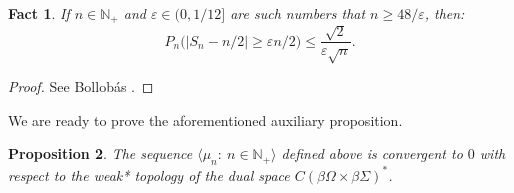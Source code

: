 \documentclass[11pt]{amsart}
\newtheorem{theorem}{Theorem}[section]
\newtheorem{proposition}[theorem]{Proposition}
\newtheorem{fact}[theorem]{Fact}
\theoremstyle{definition}
\theoremstyle{remark}
\numberwithin{equation}{section}
\newcommand{\eps}{\varepsilon}
\newcommand{\N}{\mathbb{N}}
\newcommand{\seq}[2]{\big\langle#1\colon\ #2\big\rangle}
\newcommand{\seqn}[1]{\big\langle#1\colon\ n\io\big\rangle}
\newcommand{\io}{\in\mathbb{N}}%
\newcommand{\bo}{{\beta\omega}}%
\begin{document}
\begin{fact}\label{fact:bollobas}
If $n\io_+$ and $\eps\in\big(0,1/12\big]$ are such numbers that $n\ge48/\eps$, then:
\[P_n\big(\big|S_n-n/2\big|\ge\eps n/2\big)\le%
\frac{\sqrt{2}}{\eps\sqrt{n}}.\]
\end{fact}
\begin{proof}
See Bollob\'as \cite[Theorem 1.7.(i)]{Bol01}.
\end{proof}

\medskip

We are ready to prove the aforementioned auxiliary proposition.

\begin{proposition}\label{prop:fsjnp_product_omega_sigma}
The sequence $\seq{\mu_n}{n\io_+}$ defined above is convergent to $0$ with respect to the weak* topology of the dual space $C(\beta\Omega\times\beta\Sigma)^*$.%
\end{proposition}
\end{document}
